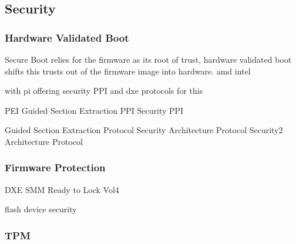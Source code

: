 
\subsection{Security}

\subsubsection{Hardware Validated Boot}
Secure Boot relies for the firmware as its root of trust, hardware validated boot shifts this trusts out of the firmware image into hardware.
amd
intel

with pi offering security PPI and dxe protocols for this

PEI Guided Section Extraction PPI
Security PPI

Guided Section Extraction Protocol
Security Architecture Protocol
Security2 Architecture Protocol


\subsubsection{Firmware Protection}




DXE SMM Ready to Lock Vol4




flash device security







\subsubsection{TPM}

